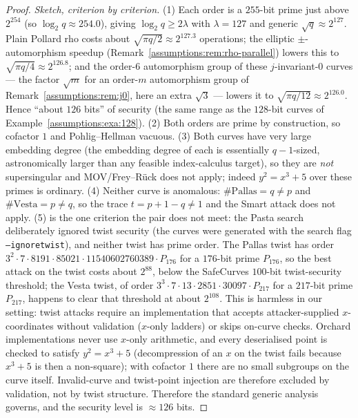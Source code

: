 \documentclass[11pt,a4paper]{article}
\theoremstyle{definition}
\theoremstyle{remark}
\begin{document}
\begin{proof}
\emph{Sketch, criterion by criterion.}
(1) Each order is a \(255\)-bit prime just above \(2^{254}\) (so \(\log_2 q \approx 254.0\)), giving \(\log_2 q \ge 2\lambda\) with \(\lambda = 127\) and generic \(\sqrt{q} \approx 2^{127}\). Plain Pollard rho costs about \(\sqrt{\pi q/2} \approx 2^{127.3}\) operations; the elliptic \(\pm\)-automorphism speedup (Remark~\ref{assumptions:rem:rho-parallel}) lowers this to \(\sqrt{\pi q/4} \approx 2^{126.8}\); and the order-\(6\) automorphism group of these \(j\)-invariant-\(0\) curves --- the factor \(\sqrt{m}\) for an order-\(m\) automorphism group of Remark~\ref{assumptions:rem:j0}, here an extra \(\sqrt{3}\) --- lowers it to \(\sqrt{\pi q/12} \approx 2^{126.0}\). Hence ``about \(126\) bits'' of security (the same range as the \(128\)-bit curves of Example~\ref{assumptions:exa:128}).
(2) Both orders are prime by construction, so cofactor \(1\) and Pohlig--Hellman vacuous.
(3) Both curves have very large embedding degree (the embedding degree of each is essentially \(q-1\)-sized, astronomically larger than any feasible index-calculus target), so they are \emph{not} supersingular and MOV/Frey--Rück does not apply; indeed \(y^2=x^3+5\) over these primes is ordinary.
(4) Neither curve is anomalous: \(\#\mathrm{Pallas}=q\ne p\) and \(\#\mathrm{Vesta}=p\ne q\), so the trace \(t = p+1-q \ne 1\) and the Smart attack does not apply.
(5) is the one criterion the pair does not meet: the Pasta search deliberately ignored twist security (the curves were generated with the search flag \texttt{--ignoretwist}), and neither twist has prime order. The Pallas twist has order \(3^2 \cdot 7 \cdot 8191 \cdot 85021 \cdot 11540602760389 \cdot P_{176}\) for a \(176\)-bit prime \(P_{176}\), so the best attack on the twist costs about \(2^{88}\), below the SafeCurves \(100\)-bit twist-security threshold; the Vesta twist, of order \(3^3 \cdot 7 \cdot 13 \cdot 2851 \cdot 30097 \cdot P_{217}\) for a \(217\)-bit prime \(P_{217}\), happens to clear that threshold at about \(2^{108}\). This is harmless in our setting: twist attacks require an implementation that accepts attacker-supplied \(x\)-coordinates without validation (\(x\)-only ladders) or skips on-curve checks. Orchard implementations never use \(x\)-only arithmetic, and every deserialised point is checked to satisfy \(y^2 = x^3 + 5\) (decompression of an \(x\) on the twist fails because \(x^3 + 5\) is then a non-square); with cofactor \(1\) there are no small subgroups on the curve itself. Invalid-curve and twist-point injection are therefore excluded by validation, not by twist structure.
Therefore the standard generic analysis governs, and the security level is \(\approx 126\) bits.
\end{proof}
\end{document}
